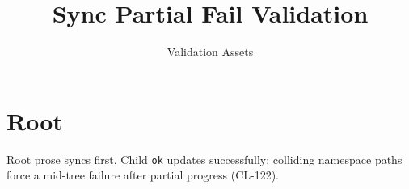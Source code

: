 \documentclass[11pt]{article}
\title{Sync Partial Fail Validation}
\author{Validation Assets}
\date{}
\begin{document}
\maketitle

\section{Root}
\label{sec:root}

Root prose syncs first. Child \texttt{ok} updates successfully; colliding
namespace paths force a mid-tree failure after partial progress (CL-122).



\end{document}
